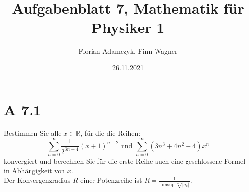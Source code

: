 \documentclass{article}
\date{26.11.2021}
\title{Aufgabenblatt 7, Mathematik für Physiker 1}
\author{Florian Adamczyk, Finn Wagner}
\begin{document}
    \maketitle

    \section*{A 7.1}
    Bestimmen Sie alle \(x \in \mathbb{R}\), für die die Reihen:
    \[
        \sum_{n=0}^{\infty} \frac{1}{2^{3n-4}} {(x+1)}^{n+2} \text{ und } \sum_{n=0}^{\infty} (3n^3 + 4n^2 -4)x^n
    \]
    konvergiert und berechnen Sie für die erste Reihe auch eine geschlossene Formel in Abhängigkeit von \(x\). \\
    Der Konvergenzradius \(R\) einer Potenzreihe ist \(R = \frac{1}{ \limsup \sqrt[n]{|a_n|} } \). \\
\end{document}
